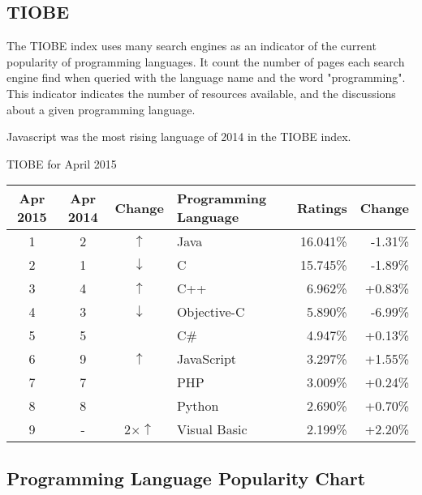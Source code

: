 \subsection{TIOBE}

The TIOBE index uses many search engines as an indicator of the current popularity of programming languages.
It count the number of pages each search engine find when queried with the language name and the word "programming".
This indicator indicates the number of resources available, and the discussions about a given programming language.

Javascript was the most rising language of 2014 in the TIOBE index.

TIOBE for April 2015\\
\begin{tabular}{c c c l r r}
Apr 2015 & Apr 2014 & Change           & Programming Language & Ratings  & Change  \\ \hline
1        & 2        & $\uparrow$       & Java                 & 16.041\% & -1.31\%  \\ \hline
2        & 1        & $\downarrow$     & C                    & 15.745\% & -1.89\%  \\ \hline
3        & 4        & $\uparrow$       & C++                  & 6.962\%  & +0.83\%  \\ \hline
4        & 3        & $\downarrow$     & Objective-C          & 5.890\%  & -6.99\%  \\ \hline
5        & 5        &                  & C\#                  & 4.947\%  & +0.13\%  \\ \hline
6        & 9        & $\uparrow$       & JavaScript           & 3.297\%  & +1.55\%  \\ \hline
7        & 7        &                  & PHP                  & 3.009\%  & +0.24\%  \\ \hline
8        & 8        &                  & Python               & 2.690\%  & +0.70\%  \\ \hline
9        & -        & $2\times\uparrow$ & Visual Basic        & 2.199\%  & +2.20\%  \\ \hline
\end{tabular}



\subsection{Programming Language Popularity Chart}

